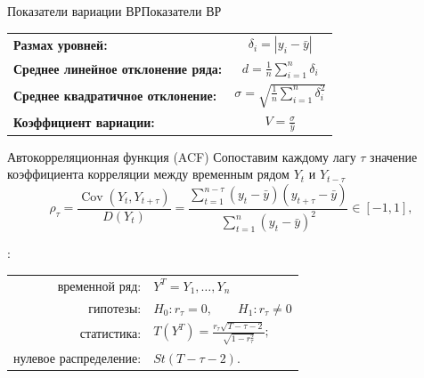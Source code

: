 \documentclass[10pt,pdf,utf8,hyperref={unicode},aspectratio=169]{beamer}
\begin{document}
\begin{frame}{Показатели вариации ВР}{Показатели ВР}
	
	\renewcommand{\arraystretch}{2}	
	\begin{tabular}{>{\bfseries}lc}
		Размах  уровней: &
		$\displaystyle \delta_i = |y_i - \bar{y}|$
		\\
		Среднее линейное отклонение ряда: &
		$\displaystyle d = \frac{1}{n}\sum_{i=1}^{n} \delta_i$
		\\
		Среднее квадратичное отклонение: &
		$\displaystyle \sigma = \sqrt{\frac{1}{n}\sum_{i=1}^{n} \delta^2_i}$
		\\
		Коэффициент вариации: & 
		$\displaystyle V = \frac{\sigma}{\bar{y}}$
		\\
	\end{tabular}
\end{frame}


\begin{frame}{Автокорреляционная функция (ACF)}{}
	Сопоставим каждому лагу $\tau$ значение коэффициента корреляции между временным рядом $Y_t$ и $Y_{t-\tau}$
	$$
		\rho_\tau  
		=  \frac{\mathop{\mathrm{Cov}} (Y_t,Y_{t+\tau})}{D(Y_t)} 
		= \frac{\sum\limits_{t=1}^{n-\tau} \left(y_t - \bar{y}\right)\left(y_{t+\tau} - \bar{y}\right) }{ \sum\limits_{t=1}^n \left(y_t - \bar{y}\right)^2 }\in\left[-1,1\right],
	$$
		
		\bigskip
		
		:
		\begin{center}
			\begin{tabular}{rl}
				временной ряд:                  & $Y^T = Y_1,\dots,Y_n$ \\
				гипотезы:               & $H_0\colon r_\tau=0, \qquad H_1\colon r_\tau \neq 0 $ \\
				статистика:                     & $\displaystyle T\left(Y^T\right) = \frac{r_{\tau} \sqrt{T-\tau-2}}{\sqrt{1-r_\tau^2}};$ \\
				нулевое распределение:          & $St\left(T-\tau-2\right)$.\\
			\end{tabular}
		\end{center}
\end{frame}
\end{document}
